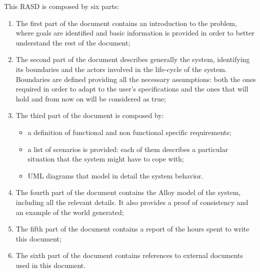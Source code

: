 This RASD is composed by six parts:
\begin{enumerate}
\item The first part of the document contains an introduction to the problem, where goals are identified and basic information is provided in order to better understand the rest of the document;
\item The second part of the document describes generally the system, identifying its boundaries and the actors involved in the life-cycle of the system. Boundaries are defined providing all the necessary assumptions: both the ones required in order to adapt to the user's specifications and the ones that will hold and from now on will be considered as true;
\item The third part of the document is composed by:
	\begin{itemize}
	\item a definition of functional and non functional specific requirements;
	\item a list of scenarios is provided: each of them describes a particular situation that the system might have to cope with;
	\item UML diagrams that model in detail the system behavior.
	\end{itemize}
\item The fourth part of the document contains the Alloy model of the system, including all the relevant 
details. It also provides a proof of consistency and an example of the world generated;
\item The fifth part of the document contains a report of the hours spent to write this document;
\item The sixth part of the document contains references to external documents used in this document.
\end{enumerate}
